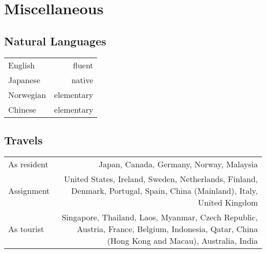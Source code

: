 \section*{Miscellaneous}
\subsection*{Natural Languages}
\begin{tabular}{L!{\VRule}R}  
English & fluent \\
Japanese & native \\
Norwegian & elementary \\
Chinese & elementary \\
\end{tabular}

\subsection*{Travels}
\begin{tabular}{L!{\VRule}R}  
As resident & Japan, Canada, Germany, Norway, Malaysia \\
Assignment & United States, Ireland, Sweden, Netherlands, Finland,
Denmark, Portugal, Spain, China (Mainland), Italy, United Kingdom \\
As tourist & Singapore, Thailand, Laos, Myanmar, Czech Republic,
Austria, France, Belgium, Indonesia, Qatar, China (Hong Kong and
Macau), Australia, India\\
\end{tabular}
